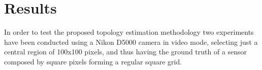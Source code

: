 \section{Results}

%



In order to test the proposed topology estimation methodology two experiments have been conducted using a Nikon D5000 camera in video mode, selecting just a central region of 100x100 pixels, and thus having the ground truth of a sensor composed by square pixels forming a regular square grid.

%





